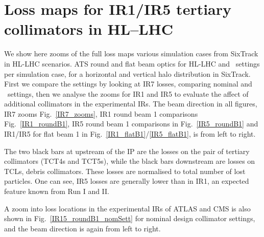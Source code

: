 \section{Loss maps for IR1/IR5 tertiary collimators in HL--LHC \label{lossmapszooms}}

We show here zooms of the full loss maps various simulation cases from SixTrack in HL-LHC scenarios. ATS round and flat beam optics for HL-LHC and \twosigmaret~settings per simulation case, for a horizontal and vertical halo distribution in SixTrack. First we compare the settings by looking at IR7 losses, comparing nominal and \twosigmaret~settings, then we analyse the zooms for IR1 and IR5 to evaluate the affect of additional collimators in the experimental IRs. The beam direction in all figures, IR7 zooms Fig.~\ref{IR7_zooms}, IR1 round beam 1 comparisons Fig.~\ref{IR1_roundB1}, IR5 round beam 1 comparisons in Fig.~\ref{IR5_roundB1} and IR1/IR5 for flat beam 1 in Fig.~\ref{IR1_flatB1}/\ref{IR5_flatB1}, is from left to right. 

The two black bars at upstream of the IP are the losses on the pair of tertiary collimators (TCT4s and TCT5s), while the black bars downstream are losses on TCLs, debris collimators. These losses are normalised to total number of lost particles. One can see, IR5 losses are generally lower than in IR1, an expected feature known from Run I and II. %

A zoom into loss locations in the experimental IRs of ATLAS and CMS is also shown in Fig.~\ref{IR15_roundB1_nomSett} for nominal design collimator settings, and the beam direction is again from left to right.



